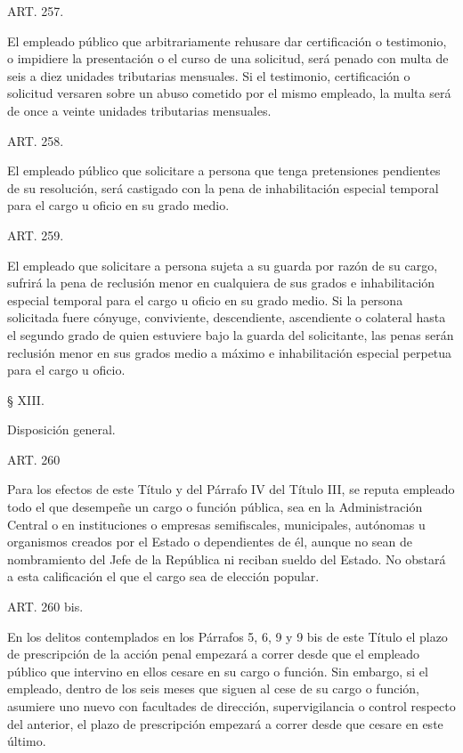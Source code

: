     ART. 257.

    El empleado público que arbitrariamente rehusare dar certificación o testimonio, o impidiere la presentación o el curso de una solicitud, será penado con multa de seis a diez unidades tributarias mensuales.
    Si el testimonio, certificación o solicitud versaren sobre un abuso cometido por el mismo empleado, la multa será de once a veinte unidades tributarias mensuales.





    ART. 258.

    El empleado público que solicitare a persona que tenga pretensiones pendientes de su resolución, será castigado con la pena de inhabilitación especial temporal para el cargo u oficio en su grado medio.



    ART. 259.

    El empleado que solicitare a persona sujeta a su guarda por razón de su cargo, sufrirá la pena de reclusión menor en cualquiera de sus grados e inhabilitación especial temporal para el cargo u oficio en su grado medio.
    Si la persona solicitada fuere cónyuge, conviviente, descendiente, ascendiente o colateral hasta el segundo grado de quien estuviere bajo la guarda del solicitante, las penas serán reclusión menor en sus grados medio a máximo e inhabilitación especial perpetua para el cargo u oficio.


    § XIII.

    Disposición general.





    ART. 260
   
    Para los efectos de este Título y del Párrafo IV del Título III, se reputa empleado todo el que desempeñe un cargo o función pública, sea en la Administración Central o en instituciones o empresas semifiscales, municipales, autónomas u organismos creados por el Estado o dependientes de él, aunque no sean de nombramiento del Jefe de la República ni reciban sueldo del Estado. No obstará a esta calificación el que el cargo sea de elección popular.





    ART. 260 bis.

    En los delitos contemplados en los Párrafos 5, 6, 9 y 9 bis de este Título el plazo de prescripción de la acción penal empezará a correr desde que el empleado público que intervino en ellos cesare en su cargo o función. Sin embargo, si el empleado, dentro de los seis meses que siguen al cese de su cargo o función, asumiere uno nuevo con facultades de dirección, supervigilancia o control respecto del anterior, el plazo de prescripción empezará a correr desde que cesare en este último.




